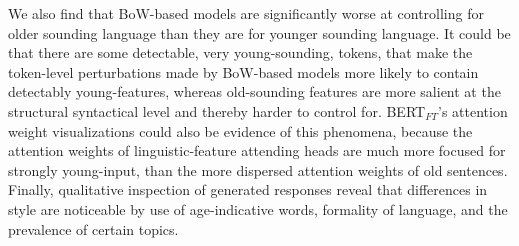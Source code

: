 We also find that BoW-based models are significantly worse at controlling for older sounding language than they are for younger sounding language. It could be that there are some detectable, very young-sounding, tokens, that make the token-level perturbations made by BoW-based models more likely to contain detectably young-features, whereas old-sounding features are more salient at the structural syntactical level and thereby harder to control for. BERT$_{FT}$'s attention weight visualizations could also be evidence of this phenomena, because the attention weights of linguistic-feature attending heads are much more focused for strongly young-input, than the more dispersed attention weights of old sentences. Finally, qualitative inspection of generated responses reveal that differences in style are noticeable by use of age-indicative words, formality of language, and the prevalence of certain topics.

